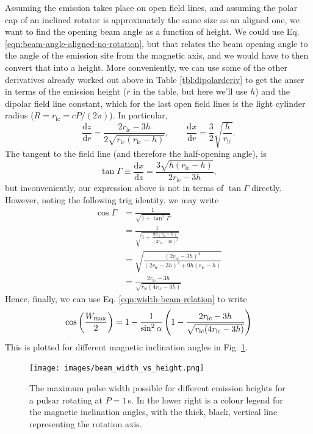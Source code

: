 \documentclass{book}
\newcommand{\deriv}[2]{\frac{\text{d}{#1}}{\text{d}{#2}}}
\newcommand{\rL}{r_\text{lc}} %
\begin{document}
Assuming the emission takes place on open field lines, and assuming the polar cap of an inclined rotator is approximately the same size as an aligned one, we want to find the opening beam angle as a function of height.
We could use Eq. \eqref{eqn:beam-angle-aligned-no-rotation}, but that relates the beam opening angle to the angle of the emission site from the magnetic axis, and we would have to then convert that into a height.
More conveniently, we can use some of the other derivatives already worked out above in Table \ref{tbl:dipolarderiv} to get the anser in terms of the emission height ($r$ in the table, but here we'll use $h$) and the dipolar field line constant, which for the last open field lines is the light cylinder radius ($R = \rL = cP/(2\pi)$).
In particular,
\begin{equation}
  \deriv{z}{r} = \frac{2\rL - 3h}{2\sqrt{\rL(\rL - h)}},
  \qquad
  \deriv{x}{r} = \frac{3}{2} \sqrt{\frac{h}{\rL}}.
\end{equation}
The tangent to the field line (and therefore the half-opening angle), is
\begin{equation}
  \tan\Gamma \equiv \deriv{x}{z}
    = \frac{3\sqrt{h(\rL - h)}}{2\rL - 3h},
\end{equation}
but inconveniently, our expression above is not in terms of $\tan\Gamma$ directly.
However, noting the following trig identity. we may write
\begin{equation}
  \begin{aligned}
    \cos\Gamma
      &= \frac{1}{\sqrt{1 + \tan^2\Gamma}} \\
      &= \frac{1}{\sqrt{1 + \frac{9h(\rL - h)}{(2\rL - 3h)^2}}} \\
      &= \sqrt{\frac{(2\rL - 3h)^2}{(2\rL - 3h)^2 + 9h(\rL - h)}} \\
      &= \frac{2\rL - 3h}{\sqrt{\rL(4\rL - 3h)}}
  \end{aligned}
  \label{eqn:Gamma_vs_h_exact}
\end{equation}
Hence, finally, we can use Eq. \eqref{eqn:width-beam-relation} to write
\begin{equation}
  \cos\bigg(\frac{W_{\rm max}}{2}\bigg)
    = 1 - \frac{1}{\sin^2\alpha}\left( 1 - \frac{2\rL - 3h}{\sqrt{\rL(4\rL - 3h)}} \right)
    \label{eqn:W_vs_h_exact}
\end{equation}
This is plotted for different magnetic inclination angles in Fig. \ref{fig:beam_width_vs_height}.
\begin{figure}[th]
    \centering
    \texttt{[image: images/beam\_width\_vs\_height.png]}
    \caption{The maximum pulse width possible for different emission heights for a pulsar rotating at $P = 1\,$s. In the lower right is a colour legend for the magnetic inclination angles, with the thick, black, vertical line representing the rotation axis.}
    \label{fig:beam_width_vs_height}
\end{figure}
\end{document}

